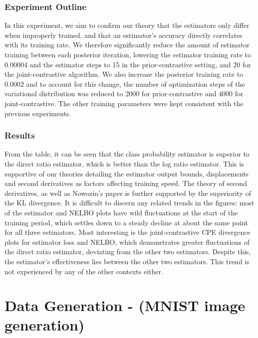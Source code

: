 \documentclass[honours,12pt]{unswthesis}
\numberwithin{equation}{section}
\theoremstyle{definition}
\begin{document}
\subsection{Experiment Outline}
In this experiment, we aim to confirm our theory that the estimators only differ when improperly trained, and that an estimator's accuracy directly correlates with its training rate. We therefore significantly reduce the amount of estimator training between each posterior iteration, lowering the estimator training rate to 0.00004 and the estimator steps to 15 in the prior-contrastive setting, and 20 for the joint-contrastive algorithm. We also increase the posterior training rate to 0.0002 and to account for this change, the number of optimization steps of the variational distribution was reduced to 2000 for prior-contrastive and 4000 for joint-contrastive. The other training parameters were kept consistent with the previous experiments.
\subsection{Results}
From the table, it can be seen that the class probability estimator is superior to the direct ratio estimator, which is better than the log ratio estimator. This is supportive of our theories detailing the estimator output bounds, displacements and second derivatives as factors affecting training speed. The theory of second derivatives, as well as Nowozin's paper is further supported by the superiority of the KL divergence. It is difficult to discern any related trends in the figures: most of the estimator and NELBO plots have wild fluctuations at the start of the training period, which settles down to a steady decline at about the same point for all three estimators. Most interesting is the joint-contrastive CPE divergence plots for estimator loss and NELBO, which demonstrates greater fluctuations of the direct ratio estimator, deviating from the other two estimators. Despite this, the estimator's effectiveness lies between the other two estimators. This trend is not experienced by any of the other contexts either.
\newpage
\chapter{Data Generation - (MNIST image generation)}
\end{document}
